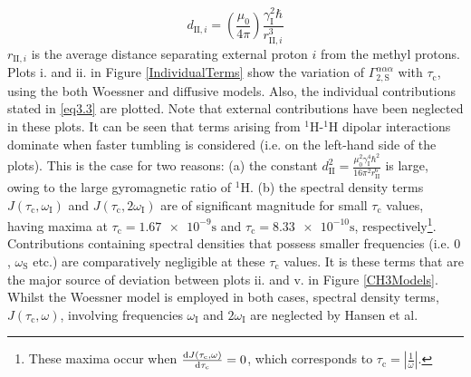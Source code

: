 \begin{equation}
d_{\text{II},i} = \left( \frac{\mu_0}{4 \pi}\right) \frac{\gamma_{\text{I}}^2 \hbar}{r_{\text{II},i}^3}
\end{equation}
$r_{\text{II},i}$ is the average distance separating external proton $i$ from the methyl protons.\\
Plots i. and ii. in Figure \ref{IndividualTerms} show the variation of $\Gamma_{2,\text{S}}^{\alpha\alpha\alpha}$ with $\tau_{\text{c}}$, using the both Woessner and diffusive models. Also, the individual contributions stated in \ref{eq3.3} are plotted.  Note that external contributions have been neglected in these plots. It can be seen that terms arising from $^{1}$H-$^{1}$H dipolar interactions dominate when faster tumbling is considered (i.e. on the left-hand side of the plots). This is the case for two reasons: (a) the constant $d_{\text{II}}^2 = \frac{\mu_0^2 \gamma_{\text{I}}^4 \hbar^2}{16 \pi^2 r_{\text{II}}^6}$ is large, owing to the large gyromagnetic ratio of $^1$H. (b) the spectral density terms $J\left(\tau_{\text{c}},\omega_{\text{I}}\right)$ and $J\left(\tau_{\text{c}},2\omega_{\text{I}}\right)$ are of significant magnitude for small $\tau_{\text{c}}$ values, having maxima at $\tau_{\text{c}} = \num{1.67e-9} \si{\second}$ and $\tau_{\text{c}} = \num{8.33e-10} \si{\second}$, respectively\footnote{These maxima occur when $\dv{J\left(\tau_{\text{c}},\omega\right)}{\tau_{\text{c}}} = 0$, which corresponds to $\tau_{\text{c}} = |\frac{1}{\omega}|$.}. Contributions containing spectral densities that possess smaller frequencies (i.e. $0$, $\omega_{\text{S}}$ etc.) are comparatively negligible at these $\tau_{\text{c}}$ values. It is these terms that are the major source of deviation between plots ii. and v. in Figure \ref{CH3Models}. Whilst the Woessner model is employed in both cases, spectral density terms, $J\left(\tau_{\text{c}}, \omega \right)$, involving frequencies $\omega_{\text{I}}$ and $2 \omega_{\text{I}}$ are neglected by Hansen et al.\\
